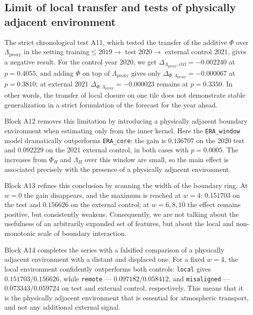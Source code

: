 \documentclass[11pt,a4paper]{article}
\theoremstyle{definition}
\theoremstyle{plain}
\theoremstyle{remark}
\begin{document}
\subsection{Limit of local transfer and tests of physically adjacent environment}

The strict chronological test A11, which tested the transfer of the additive $\Phi$ over $\Lambda_{\mathrm{proxy}}$ in the setting training$\le 2019 \rightarrow$ test $2020 \rightarrow$ external control $2021$, gives a negative result. For the control year 2020, we get $\Delta_{\Lambda_{\mathrm{proxy}},\mathrm{ctrl}}=-0.002240$ at $p=0.4055$, and adding $\Phi$ on top of $\Lambda_{\mathrm{proxy}}$ gives only $\Delta_{\Phi,\Lambda_{\mathrm{proxy}}}=-0.000067$ at $p=0.3810$; at external 2021 $\Delta_{\Phi,\Lambda_{\mathrm{proxy}}}=-0.000023$ remains at $p=0.3350$. In other words, the transfer of local closure on one tile does not demonstrate stable generalization in a strict formulation of the forecast for the year ahead.

Block A12 removes this limitation by introducing a physically adjacent boundary environment when estimating only from the inner kernel. Here the \texttt{ERA\_window} model dramatically outperforms \texttt{ERA\_core}: the gain is $0.136707$ on the 2020 test and $0.092229$ on the 2021 external control, in both cases with $p=0.0005$. The increases from $\Phi_H$ and $\Lambda_H$ over this window are small, so the main effect is associated precisely with the presence of a physically adjacent environment.

Block A13 refines this conclusion by scanning the width of the boundary ring. At $w=0$ the gain disappears, and the maximum is reached at $w=4$: $0.151703$ on the test and $0.156626$ on the external control; at $w=6,8,10$ the effect remains positive, but consistently weakens. Consequently, we are not talking about the usefulness of an arbitrarily expanded set of features, but about the local and non-monotonic scale of boundary interaction.

Block A14 completes the series with a falsified comparison of a physically adjacent environment with a distant and displaced one. For a fixed $w=4$, the local environment confidently outperforms both controls: \texttt{local} gives $0.151703/0.156626$, while \texttt{remote} --- $0.097182/0.058412$, and \texttt{misaligned} --- $0.073343/0.059724$ on test and external control, respectively. This means that it is the physically adjacent environment that is essential for atmospheric transport, and not any additional external signal.
\end{document}
